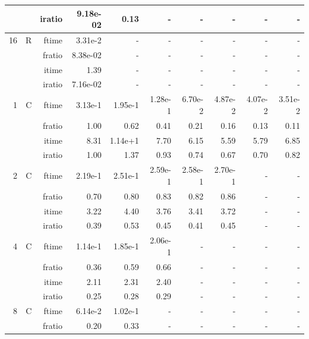 \documentclass[a4paper]{article}
\begin{document}
\begin{table}[htbp]
\begin{center}
\begin{small}
\begin{tabular}{|r|r|r|r|r|r|r|r|r|r|}
             &             &  iratio &    9.18e-02 &   0.13 &      - &      - &      - &      - &      - \\\hline
   16 &   R &   ftime &    3.31e-2 &      - &      - &      - &      - &      - &      - \\
             &             &  fratio &    8.38e-02 &     - &      - &      - &      - &      - &      - \\
             &             &  itime &    1.39  &      - &      - &      - &      - &      - &      - \\
             &             &  iratio &    7.16e-02 &     - &      - &      - &      - &      - &      - \\\hline\hline
      1  &   C &   ftime &   3.13e-1 &    1.95e-1 &    1.28e-1 &    6.70e-2 &    4.87e-2 &    4.07e-2 &    3.51e-2 \\
           &            &  fratio &    1.00 &    0.62 &    0.41 &    0.21 &    0.16 &    0.13 &    0.11 \\
           &            &  itime &   8.31  &    1.14e+1 &    7.70  &    6.15  &    5.59  &    5.79  &    6.85  \\
           &            &  iratio &    1.00 &    1.37 &    0.93 &    0.74 &    0.67 &    0.70 &    0.82   \\\hline
   2  &   C &   ftime &   2.19e-1 &    2.51e-1 &    2.59e-1 &    2.58e-1 &    2.70e-1 &   - &   - \\
           &            &  fratio &   0.70 &    0.80 &    0.83 &    0.82 &    0.86 &   - &   - \\
           &            &  itime &   3.22  &    4.40  &    3.76  &    3.41  &    3.72  &   - &   - \\
           &            &  iratio &   0.39 &    0.53 &    0.45 &    0.41 &    0.45 &   - &   -   \\\hline
   4  &   C &   ftime &   1.14e-1 &    1.85e-1 &    2.06e-1 &   - &   - &   - &   - \\
           &            &  fratio &   0.36 &    0.59 &    0.66 &   - &   - &   - &   - \\
           &            &  itime &   2.11  &    2.31  &    2.40  &   - &   - &   - &   - \\
           &            &  iratio &   0.25 &    0.28 &    0.29 &   - &   - &   - &   -   \\\hline
   8  &   C &   ftime &   6.14e-2 &    1.02e-1 &   - &   - &   - &   - &   - \\
           &            &  fratio &   0.20 &    0.33 &   - &   - &   - &   - &   - \\

\end{tabular}
\end{small}
\end{center}
\end{table}
\end{document}

